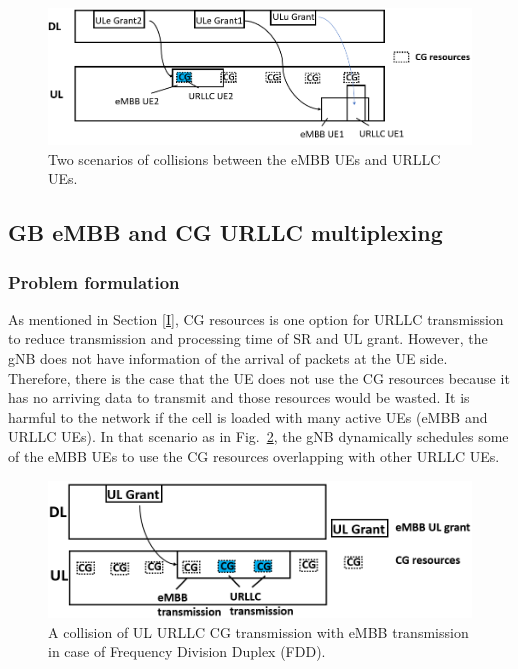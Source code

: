 \documentclass{ieeeaccess}
\begin{document}
\begin{figure}[htbp]
\centerline{\includegraphics[scale=0.33]{fig21.PNG}}
\caption{Two scenarios of collisions between the eMBB UEs and URLLC UEs.}
\label{fig21}
\end{figure}

\subsection{GB eMBB and CG URLLC multiplexing}\label{IIB}
\subsubsection{Problem formulation}\label{IIB1}
As mentioned in Section \ref{I}, CG resources is one option for URLLC transmission to reduce transmission and processing time of SR and UL grant. However, the gNB does not have information of the arrival of packets at the UE side. Therefore, there is the case that the UE does not use the CG resources because it has no arriving data to transmit and those resources would be wasted. It is harmful to the network if the cell is loaded with many active UEs (eMBB and URLLC UEs). In that scenario as in Fig.~\ref{fig1}, the gNB dynamically schedules some of the eMBB UEs to use the CG resources overlapping with other URLLC UEs.

\begin{figure}[htbp]
\centerline{\includegraphics[scale=0.32]{fig1.PNG}}
\caption{A collision of UL URLLC CG transmission with eMBB transmission in case of Frequency Division Duplex (FDD).}
\label{fig1}
\end{figure}
\end{document}
